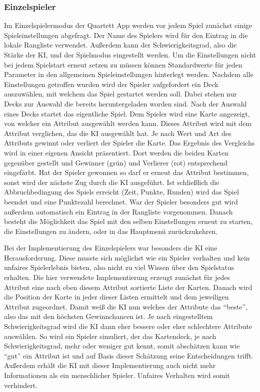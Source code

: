 \documentclass{scrartcl}
\begin{document}
\subsubsection{Einzelspieler}

\noindent
Im Einzelspielermodus der Quartett App werden vor jedem Spiel zunächst einige
Spieleinstellungen abgefragt. Der Name des Spielers wird für den Eintrag in die
lokale Rangliste verwendet. Außerdem kann der Schwierigkeitsgrad, also die
Stärke der KI, und der Spielmodus eingestellt werden. Um die Einstellungen nicht
bei jedem Spielstart erneut setzen zu müssen können Standardwerte für jeden
Parameter in den allgemeinen Spieleinstellungen hinterlegt werden. Nachdem alle
Einstellungen getroffen wurden wird der Spieler aufgefordert ein Deck
auszuwählen, mit welchem das Spiel gestartet werden soll. Dabei stehen nur Decks
zur Auswahl die bereits heruntergeladen worden sind. Nach der Auswahl eines
Decks startet das eigentliche Spiel. Dem Spieler wird eine Karte angezeigt, von
welcher ein Attribut ausgewählt werden kann. Dieses Attribut wird mit dem
Attribut verglichen, das die KI ausgewählt hat. Je nach Wert und Art des
Attributs gewinnt oder verliert der Spieler die Karte. Das Ergebnis des
Vergleichs wird in einer eigenen Ansicht präsentiert. Dort werden die beiden
Karten gegenüber gestellt und Gewinner (grün) und Verlierer (rot) entsprechend
eingefärbt. Hat der Spieler gewonnen so darf er erneut das Attribut bestimmen,
sonst wird der nächste Zug durch die KI ausgeführt. Ist schließlich die
Abbruchbedingung des Spiels erreicht (Zeit, Punkte, Runden) wird das Spiel
beendet und eine Punktezahl berechnet. War der Spieler besonders gut wird
außerdem automatisch ein Eintrag in der Rangliste vorgenommen. Danach besteht
die Möglichkeit das Spiel mit den selben Einstellungen erneut zu starten, die
Einstellungen zu ändern, oder in das Hauptmenü zurückzukehren.


\noindent
Bei der Implementierung des Einzelspielers war besonders die KI eine
Herausforderung. Diese musste sich möglichst wie ein Spieler verhalten und kein
unfaires Spielerlebnis bieten, also nicht zu viel Wissen über den Spielstatus
erhalten. Die hier verwendete Implementierung erzeugt zunächst für jedes
Attribut eine nach eben diesem Attribut sortierte Liste der Karten. Danach wird
die Position der Karte in jeder dieser Listen ermittelt und dem jeweiligen
Attribut zugeordnet. Damit weiß die KI nun welches der Attribute das
\enquote{beste}, also das mit den höchsten Gewinnchancen ist. Je nach
eingestelltem Schwierigkeitsgrad wird die KI dann eher bessere oder eher
schlechtere Attribute auswählen. So wird ein Spieler simuliert, der das
Kartendeck, je nach Schwierigkeitsgrad, mehr oder weniger gut kennt, somit
abschätzen kann wie \enquote{gut} ein Attribut ist und auf Basis dieser
Schätzung seine Entscheidungen trifft. Außerdem erhält die KI mit dieser
Implementierung auch nicht mehr Informationen als ein menschlicher Spieler.
Unfaires Verhalten wird somit verhindert.
\end{document}

